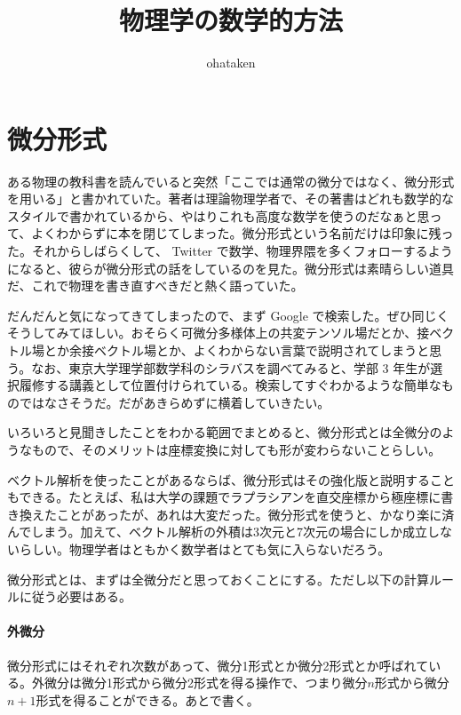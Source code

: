 \title{\huge 物理学の数学的方法}
\author{ohataken}
\maketitle

\newpage


\section{微分形式}

ある物理の教科書を読んでいると突然「ここでは通常の微分ではなく、微分形式を用いる」と書かれていた。著者は理論物理学者で、その著書はどれも数学的なスタイルで書かれているから、やはりこれも高度な数学を使うのだなぁと思って、よくわからずに本を閉じてしまった。微分形式という名前だけは印象に残った。それからしばらくして、 Twitter で数学、物理界隈を多くフォローするようになると、彼らが微分形式の話をしているのを見た。微分形式は素晴らしい道具だ、これで物理を書き直すべきだと熱く語っていた。

だんだんと気になってきてしまったので、まず Google で検索した。ぜひ同じくそうしてみてほしい。おそらく可微分多様体上の共変テンソル場だとか、接ベクトル場とか余接ベクトル場とか、よくわからない言葉で説明されてしまうと思う。なお、東京大学理学部数学科のシラバスを調べてみると、学部 3 年生が選択履修する講義として位置付けられている。検索してすぐわかるような簡単なものではなさそうだ。だがあきらめずに横着していきたい。

いろいろと見聞きしたことをわかる範囲でまとめると、微分形式とは全微分のようなもので、そのメリットは座標変換に対しても形が変わらないことらしい。

ベクトル解析を使ったことがあるならば、微分形式はその強化版と説明することもできる。たとえば、私は大学の課題でラプラシアンを直交座標から極座標に書き換えたことがあったが、あれは大変だった。微分形式を使うと、かなり楽に済んでしまう。加えて、ベクトル解析の外積は3次元と7次元の場合にしか成立しないらしい。物理学者はともかく数学者はとても気に入らないだろう。

\hrulefill

微分形式とは、まずは全微分だと思っておくことにする。ただし以下の計算ルールに従う必要はある。

\paragraph{外微分}

微分形式にはそれぞれ次数があって、微分1形式とか微分2形式とか呼ばれている。外微分は微分1形式から微分2形式を得る操作で、つまり微分$n$形式から微分$n+1$形式を得ることができる。あとで書く。

